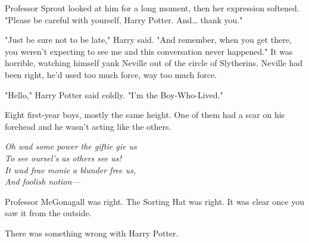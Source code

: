 Professor Sprout looked at him for a long moment, then her expression softened. 
"Please be careful with yourself, Harry Potter. And{\ldots} thank you."

"Just be sure not to be late," Harry said. "And remember, when you get there, 
you weren't expecting to see me and this conversation never happened."
\sbreak
It was horrible, watching himself yank Neville out of the circle of Slytherins. 
Neville had been right, he'd used too much force, way too much force.

"Hello," Harry Potter said coldly. "I'm the Boy-Who-Lived."

Eight first-year boys, mostly the same height. One of them had a scar on his 
forehead and he wasn't acting like the others.

\emph{Oh wad some power the giftie gie us\\
To see oursel's as others see us!\\
It wad frae monie a blunder free us,\\
And foolish notion---}

Professor McGonagall was right. The Sorting Hat was right. It was clear once 
you saw it from the outside.

There was something wrong with Harry Potter.